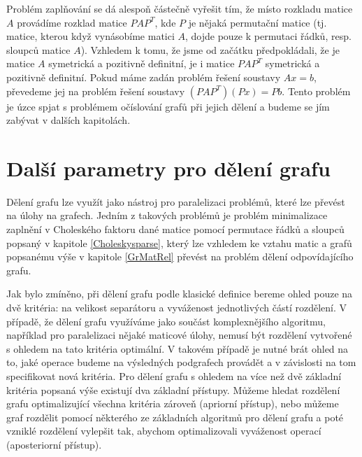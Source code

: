 \documentclass[11pt,american,czech,oneside]{book}
\theoremstyle{plain}
\theoremstyle{definition}
\begin{document}
Problém zaplňování se dá alespoň částečně vyřešit tím, že místo rozkladu matice $A$ provádíme rozklad matice $PAP^T$, kde $P$ je nějaká permutační matice (tj. matice, kterou když vynásobíme matici $A$, dojde pouze k permutaci řádků, resp. sloupců matice $A$). Vzhledem k tomu, že jsme od začátku předpokládali, že je matice $A$ symetrická a pozitivně definitní, je i matice $PAP^T$ symetrická a pozitivně definitní. Pokud máme zadán problém řešení soustavy $Ax=b$, převedeme jej na problém řešení soustavy $(PAP^T)(Px)=Pb$. Tento problém je úzce spjat s problémem očíslování grafů při jejich dělení a budeme se jím zabývat v dalších kapitolách.


\chapter{Další parametry pro dělení grafu}
\label{dalsiParametry}

Dělení grafu lze využít jako nástroj pro paralelizaci problémů, které lze převést na úlohy na grafech. Jedním z takových problémů je problém minimalizace zaplnění v Choleského faktoru dané matice pomocí permutace řádků a sloupců popsaný v kapitole \ref{Choleskysparse}, který lze vzhledem ke vztahu matic a grafů popsanému výše v kapitole \ref{GrMatRel} převést na problém dělení odpovídajícího grafu.

Jak bylo zmíněno, při dělení grafu podle klasické definice bereme ohled pouze na dvě kritéria: na velikost separátoru a vyváženost jednotlivých částí rozdělení. V případě, že dělení grafu využíváme jako součást komplexnějšího algoritmu, například pro paralelizaci nějaké maticové úlohy, nemusí být rozdělení vytvořené s ohledem na tato kritéria optimální. V takovém případě je nutné brát ohled na to, jaké operace budeme na výsledných podgrafech provádět a v závislosti na tom specifikovat nová kritéria. Pro dělení grafu s ohledem na více než dvě základní kritéria popsaná výše existují dva základní přístupy. Můžeme hledat rozdělení grafu optimalizující všechna kritéria zároveň (apriorní přístup), nebo můžeme graf rozdělit pomocí některého ze základních algoritmů pro dělení grafu a poté vzniklé rozdělení vylepšit tak, abychom optimalizovali vyváženost operací (aposteriorní přístup).
\end{document}
